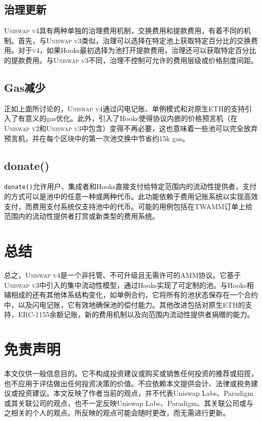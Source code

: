 \documentclass[sigconf,nonacm,prologue,table]{acmart}
\numberwithin{equation}{section}
\theoremstyle{definition}
\theoremstyle{remark}
\begin{document}
\subsection{治理更新} 
\textsc{Uniswap v4}具有两种单独的治理费用机制，交换费用和提款费用，有着不同的机制。首先，与\textsc{Uniswap v3}类似，治理可以选择在特定池上获取特定百分比的交换费用。对于\textsc{v4}，如果Hooks最初选择为池打开提款费用，治理还可以获取特定百分比的提款费用。与\textsc{Uniswap v3}不同，治理不控制可允许的费用层级或价格刻度间距。

\subsection{Gas减少}
正如上面所讨论的，\textsc{Uniswap v4}通过闪电记账、单例模式和对原生ETH的支持引入了有意义的gas优化。此外，引入了Hooks使得协议内嵌的价格预言机（在\textsc{Uniswap v2}和\textsc{Uniswap v3}中包含）变得不再必要，这也意味着一些池可以完全放弃预言机，并在每个区块中的第一次池交换中节省约15k gas。

\subsection{donate()}
\verb|donate()|允许用户、集成者和Hooks直接支付给特定范围内的流动性提供者，支付的方式可以是池中的任意一种或两种代币。此功能依赖于费用记账系统以实现高效支付，而费用支付系统仅支持池中的代币。可能的用例包括在TWAMM订单上给范围内的流动性提供者打赏或新类型的费用系统。

\section{总结}
总之，\textsc{Uniswap v4}是一个非托管、不可升级且无需许可的AMM协议。它基于\textsc{Uniswap v3}中引入的集中流动性模型，通过Hooks实现了可定制的池。与Hooks相辅相成的还有其他体系结构变化，如单例合约，它将所有的池状态保存在一个合约中，以及闪电记账，它有效地确保池的偿付能力。其他改进包括对原生ETH的支持，ERC-1155余额记账，新的费用机制以及向范围内流动性提供者捐赠的能力。




\section*{免责声明}

本文仅供一般信息目的。它不构成投资建议或购买或销售任何投资的推荐或招揽，也不应用于评估做出任何投资决策的价值。不应依赖本文提供会计、法律或税务建议或投资建议。本文反映了作者当前的观点，并不代表Uniswap Labs、Paradigm或其关联公司的观点，也不一定反映Uniswap Labs、Paradigm、其关联公司或与之相关的个人的观点。所反映的观点可能会随时更改，而无需进行更新。
\end{document}
